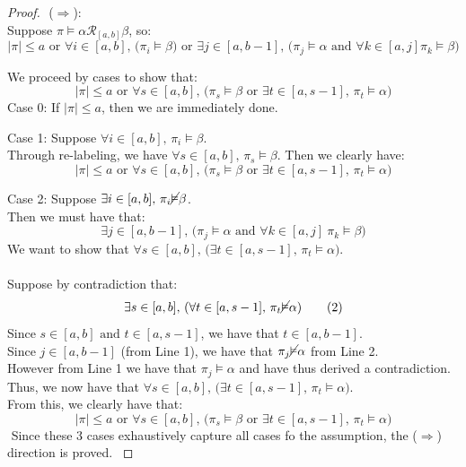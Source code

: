 \documentclass[runningheads]{llncs}
\begin{document}
\begin{proof} $ $\newline
($\Rightarrow$):\\
\indent Suppose $\pi \vDash \alpha \mathcal{R}_{[a,b]} \beta$, so:
\[ |\pi| \leq a \text{ or } \forall i \in [a,b] \text{, (} \pi_i \vDash \beta \text{) or } \exists j \in [a,b-1] \text{, (} \pi_j \vDash \alpha \text{ and } \forall k \in [a, j] \pi_k \vDash \beta \text{)} \]

We proceed by cases to show that:
\[
|\pi| \le a \text{ or } \forall s \in [a,b] \text{, (} \pi_s \vDash \beta \text{ or } \exists t \in [a, s-1] \text{, } \pi_t \vDash \alpha \text{)} \tag{A1}
\]
\indent Case 0: If $|\pi| \leq a$, then we are immediately done.

\indent Case 1: Suppose $\forall i \in [a,b] \text{, } \pi_i \vDash \beta$.\\
\indent Through re-labeling, we have $\forall s \in [a,b] \text{, } \pi_s \vDash \beta$. Then we clearly have:
\[
|\pi| \le a \text{ or } \forall s \in [a,b] \text{, (} \pi_s \vDash \beta \text{ or } \exists t \in [a, s-1] \text{, } \pi_t \vDash \alpha \text{)} \tag{A1}
\]

\indent Case 2: Suppose $\exists i \in [a,b] \text{, } \pi_i \cancel{\vDash} \beta$.\\
\indent \indent Then we must have that:
\[ \exists j \in [a,b-1] \text{, (} \pi_j \vDash \alpha \text{ and } \forall k \in [a, j] \ \pi_k \vDash \beta \text{)} \tag{1} \]
\indent \indent We want to show that $ \forall s \in [a,b] \text{, (} \exists t \in [a, s-1] \text{, } \pi_t \vDash \alpha \text{)}$.\\
\\
\indent \indent Suppose by contradiction that: 
\[ \exists s \in [a,b] \text{, (} \forall t \in [a, s-1] \text{, } \pi_t \cancel{\vDash} \alpha \text{)} \tag{2} \]
\indent \indent Since $s \in [a,b] \text{ and }  t \in [a, s-1]$, we have that $t \in [a,b-1]$.\\
\indent \indent Since $j \in [a,b-1]$ (from Line 1), we have that $\pi_j \cancel{\vDash} \alpha$ from Line 2.\\
\indent \indent However from Line 1 we have that $\pi_j \vDash \alpha$ and have thus derived a contradiction.\\
\indent \indent Thus, we now have that $ \forall s \in [a,b] \text{, (} \exists t \in [a, s-1] \text{, } \pi_t \vDash \alpha \text{)}$.\\ \indent \indent From this, we clearly have that:
\[
|\pi| \le a \text{ or } \forall s \in [a,b] \text{, (} \pi_s \vDash \beta \text{ or } \exists t \in [a, s-1] \text{, } \pi_t \vDash \alpha \text{)} \tag{A1}
\]
$ $ \newline
\indent Since these $3$ cases exhaustively capture all cases fo the assumption, the ($\Rightarrow$) direction is proved.
$ $ \newline


\end{proof}
\end{document}
